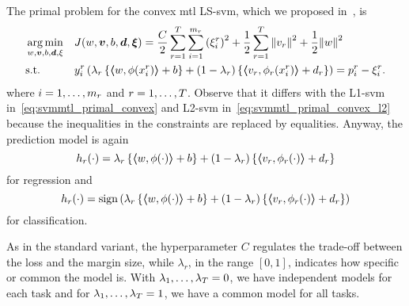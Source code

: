 The primal problem for the convex \acrshort{mtl} LS-\acrshort{svm}, which we proposed in~\cite{RuizAD21}, is
\begin{equation}\label{eq:svmmtl_primal_convex_ls}
    \begin{aligned}
    & \argmin_{w, \fv{v}, b, \fv{d}, \xi}
    & & {J({w}, \fv{v}, b, \fv{d}, \fv{\xi}) = \frac{C}{2} \sum_{r= 1}^T \sum_{i=1}^{m_r} \left({\xi_{i}^r}\right)^2 + \frac{1}{2} \sum_{r= 1}^T{\norm{{v}_r}^2} + \frac{1}{2} {\norm{{w}}}^2} \\
    & \text{s.t.}
    & & y_{i}^r \left(\lambda_r \left\lbrace \dotp{w}{\phi(x_{i}^r)} + b  \right\rbrace + (1 - \lambda_r) \left\lbrace \dotp{{v}_r}{\phi_r(x_{i}^r)} + d_r \right\rbrace  \right) = p_{i}^r - \xi_{i}^r .  \\
    \end{aligned}
\end{equation}
where $i=1, \ldots, m_r$ and $r=1, \ldots, T$.
Observe that it differs with the L1-\acrshort{svm} in~\eqref{eq:svmmtl_primal_convex} and L2-\acrshort{svm} in~\eqref{eq:svmmtl_primal_convex_l2} because the inequalities in the constraints are replaced by equalities.
Anyway, the prediction model is again
\begin{equation}
    \nonumber
    h_r(\cdot) = \lambda_r \left\lbrace \bm{\left\langle} w, \phi(\cdot) \bm{\right\rangle} + b  \right\rbrace + (1 - \lambda_r) \left\lbrace \bm{\left\langle} {v}_r, \phi_r(\cdot) \bm{\right\rangle} + d_r \right\rbrace
\end{equation}
for regression and 
\begin{equation}
    \nonumber
    h_r(\cdot) = \operatorname{sign}{ \left(\lambda_r \left\lbrace \bm{\left\langle} w, \phi(\cdot) \bm{\right\rangle} + b  \right\rbrace + (1 - \lambda_r) \left\lbrace \bm{\left\langle} {v}_r, \phi_r(\cdot) \bm{\right\rangle} + d_r \right\rbrace \right)}
\end{equation}
for classification.
%

As in the standard variant, the hyperparameter $C$ regulates the trade-off between the loss and the margin size, while $\lambda_r$, in the range $[0, 1]$, indicates how specific or common the model is. With $\lambda_1, \ldots, \lambda_T=0$, we have independent models for each task and for $\lambda_1, \ldots, \lambda_T=1$, we have a common model for all tasks. 
 


